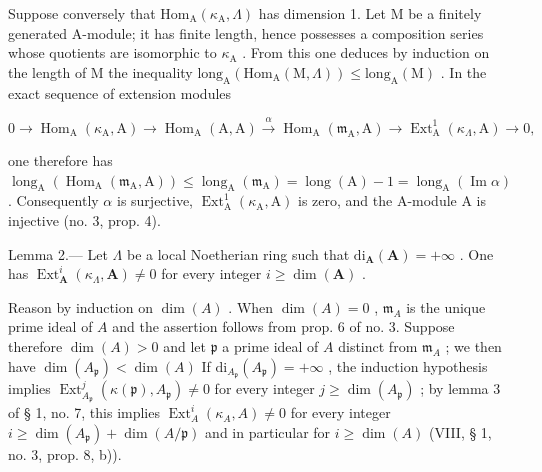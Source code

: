 Suppose conversely that \(\mathrm{Hom}_{\mathrm{A}}(\kappa_{\mathrm{A}},\Lambda)\) has dimension 1. Let M be a finitely generated A-module; it has finite length, hence possesses a composition series whose quotients are isomorphic to \(\kappa_{\mathrm{A}}\) . From this one deduces by induction on the length of M the inequality \(\mathrm{long}_{\mathrm{A}}(\mathrm{Hom}_{\mathrm{A}}(\mathrm{M},\Lambda)) \leqslant \mathrm{long}_{\mathrm{A}}(\mathrm{M})\) . In the exact sequence of extension modules

\[
0 \to \operatorname{Hom} _ {\mathrm{A}} (\kappa_ {\mathrm{A}}, \mathrm{A}) \longrightarrow \operatorname{Hom} _ {\mathrm{A}} (\mathrm{A}, \mathrm{A}) \stackrel {{\alpha}} {{\longrightarrow}} \operatorname{Hom} _ {\mathrm{A}} (\mathfrak {m} _ {\mathrm{A}}, \mathrm{A}) \longrightarrow \operatorname{Ext} _ {\mathrm{A}} ^ {1} (\kappa_ {\Lambda}, \mathrm{A}) \to 0,
\]

one therefore has \(\operatorname{long}_{\mathrm{A}}(\operatorname{Hom}_{\mathrm{A}}(\mathfrak{m}_{\mathrm{A}},\mathrm{A})) \leqslant \operatorname{long}_{\mathrm{A}}(\mathfrak{m}_{\mathrm{A}}) = \operatorname{long}(\mathrm{A}) - 1 = \operatorname{long}_{\mathrm{A}}(\operatorname{Im}\alpha)\) . Consequently \(\alpha\) is surjective, \(\operatorname{Ext}_{\mathrm{A}}^{1}(\kappa_{\mathrm{A}},\mathrm{A})\) is zero, and the A-module A is injective (no. 3, prop. 4).

Lemma 2.--- Let \(\Lambda\) be a local Noetherian ring such that \(\mathrm{di}_{\mathbf{A}}(\mathbf{A}) = +\infty\) . One has \(\operatorname{Ext}_{\mathbf{A}}^{i}(\kappa_{\Lambda}, \mathbf{A}) \neq 0\) for every integer \(i \geqslant \dim(\mathbf{A})\) .

Reason by induction on \(\dim(A)\) . When \(\dim(A) = 0\) , \(\mathfrak{m}_A\) is the unique prime ideal of \(A\) and the assertion follows from prop. 6 of no. 3. Suppose therefore \(\dim(A) > 0\) and let \(\mathfrak{p}\) a prime ideal of \(A\) distinct from \(\mathfrak{m}_A\) ; we then have \(\dim(A_{\mathfrak{p}}) < \dim(A)\) If \(\mathrm{di}_{A_{\mathfrak{p}}}(A_{\mathfrak{p}}) = +\infty\) , the induction hypothesis implies \(\operatorname{Ext}_{A_{\mathfrak{p}}}^{j}(\kappa(\mathfrak{p}), A_{\mathfrak{p}}) \neq 0\) for every integer \(j \geqslant \dim(A_{\mathfrak{p}})\) ; by lemma 3 of § 1, no. 7, this implies \(\operatorname{Ext}_{A}^{i}(\kappa_{A}, A) \neq 0\) for every integer \(i \geqslant \dim(A_{\mathfrak{p}}) + \dim(A/\mathfrak{p})\) and in particular for \(i \geqslant \dim(A)\) (VIII, § 1, no. 3, prop. 8, b)).

